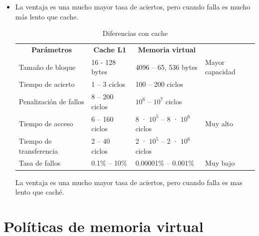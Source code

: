 \documentclass[12pt, twoside, openright]{report} %
\begin{document}
\begin{itemize}
      \begin{itemize}
      \item
        La ventaja es una mucho mayor tasa de aciertos, pero cuando
        falla es mucho más lento que cache.
\begin{table}[H]
\centering
\begin{tabular}{|l|l|l|l}
\cline{1-3}
\multicolumn{1}{|c|}{\textbf{Parámetros}} & \multicolumn{1}{c|}{\textbf{Cache L1}} & \multicolumn{1}{c|}{\textbf{Memoria virtual}} &                           \\ \cline{1-3}
Tamaño de bloque                          & 16 - 128 bytes                         & 4096 – 65, 536 bytes                          & Mayor capacidad           \\ \cline{1-3}
Tiempo de acierto                         & 1 – 3 ciclos                           & 100 – 200 ciclos                              &                           \\ \cline{1-3}
Penalización de fallos                    & 8 – 200 ciclos                         & $10^6$ – $10^7$ ciclos                              & \multirow{3}{*}{Muy alto} \\ \cline{1-3}
Tiempo de acceso                          & 6 – 160 ciclos                         & 8 · $10^5$ – 8 · $10^6$ ciclos                      &                           \\ \cline{1-3}
Tiempo de transferencia                   & 2 – 40 ciclos                          & 2 · $10^5$ – 2 · $10^6$ ciclos                      &                           \\ \cline{1-3}
Tasa de fallos                            & 0.1\% – 10\%                           & 0.00001\% – 0.001\%                           & Muy bajo                  \\ \cline{1-3}
\end{tabular}
\caption{Diferencias con cache}
\end{table}
       La ventaja es una mucho mayor tasa de aciertos, pero cuando falla es mas lento que caché.
      \end{itemize}
    \end{itemize}
 \section{Políticas de memoria virtual}
\end{document}
